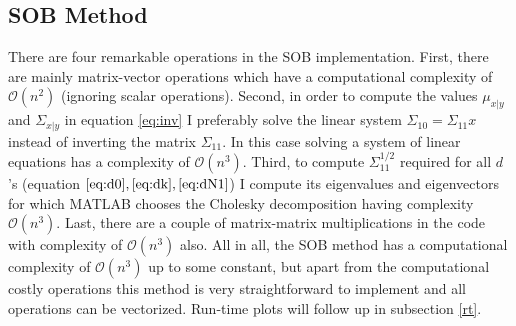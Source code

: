 \documentclass[a4paper]{article}
\begin{document}
\subsection{SOB Method}
There are four remarkable operations in the SOB implementation. First, there are mainly matrix-vector operations which have a computational complexity of $\mathcal{O}(n^2)$ (ignoring scalar operations). Second, in order to compute the values $\mu_{x|y}$ and $\Sigma_{x|y}$ in equation \ref{eq:inv} I preferably solve the linear system $\Sigma_{10} = \Sigma_{11}x$ instead of inverting the matrix $\Sigma_{11}$. In this case solving a system of linear equations has a complexity of $\mathcal{O}(n^3)$. Third, to compute $\Sigma_{11}^{1/2}$ required for all $d$'s (equation $\ref{eq:d0}, \ref{eq:dk}, \ref{eq:dN1}$) I compute its eigenvalues and eigenvectors for which MATLAB chooses the Cholesky decomposition having complexity $\mathcal{O}(n^3)$. Last, there are a couple of matrix-matrix multiplications in the code with complexity of $\mathcal{O}(n^3)$ also. All in all, the SOB method has a computational complexity of $\mathcal{O}(n^3)$ up to some constant, but apart from the computational costly operations this method is very straightforward to implement and all operations can be vectorized. Run-time plots will follow up in subsection \ref{rt}.
\end{document}
